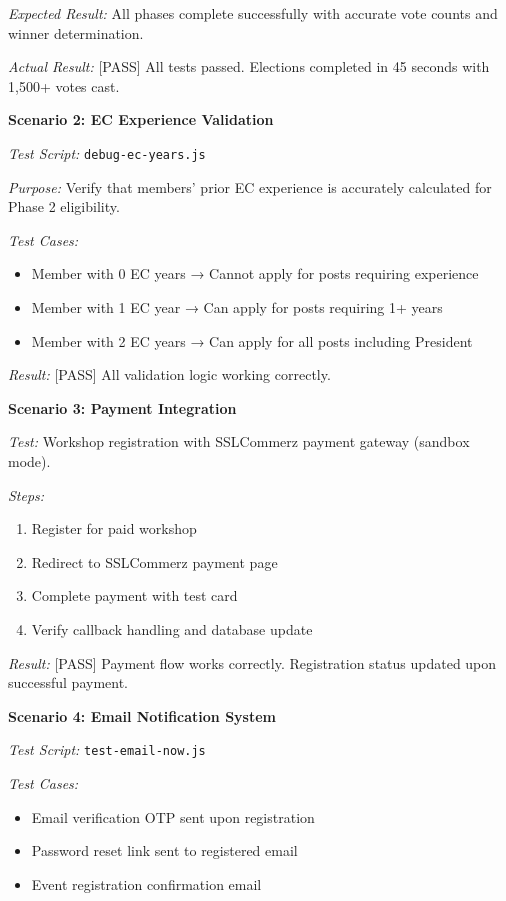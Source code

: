 \documentclass[12pt,a4paper]{article}
\begin{document}
\textit{Expected Result:} All phases complete successfully with accurate vote counts and winner determination.

\textit{Actual Result:} [PASS] All tests passed. Elections completed in 45 seconds with 1,500+ votes cast.

\textbf{Scenario 2: EC Experience Validation}

\textit{Test Script:} \texttt{debug-ec-years.js}

\textit{Purpose:} Verify that members' prior EC experience is accurately calculated for Phase 2 eligibility.

\textit{Test Cases:}
\begin{itemize}[noitemsep]
  \item Member with 0 EC years → Cannot apply for posts requiring experience
  \item Member with 1 EC year → Can apply for posts requiring 1+ years
  \item Member with 2 EC years → Can apply for all posts including President
\end{itemize}

\textit{Result:} [PASS] All validation logic working correctly.

\textbf{Scenario 3: Payment Integration}

\textit{Test:} Workshop registration with SSLCommerz payment gateway (sandbox mode).

\textit{Steps:}
\begin{enumerate}[noitemsep]
  \item Register for paid workshop
  \item Redirect to SSLCommerz payment page
  \item Complete payment with test card
  \item Verify callback handling and database update
\end{enumerate}

\textit{Result:} [PASS] Payment flow works correctly. Registration status updated upon successful payment.

\textbf{Scenario 4: Email Notification System}

\textit{Test Script:} \texttt{test-email-now.js}

\textit{Test Cases:}
\begin{itemize}[noitemsep]
  \item Email verification OTP sent upon registration
  \item Password reset link sent to registered email
  \item Event registration confirmation email
\end{itemize}
\end{document}
